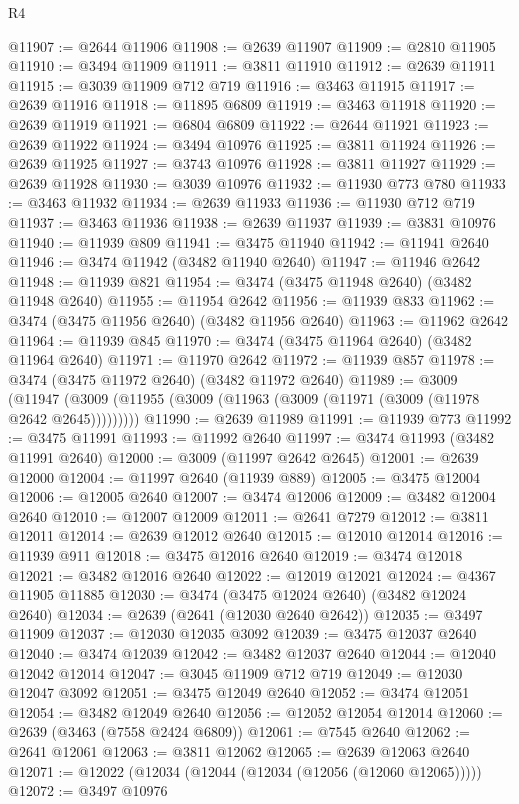\begin{lexlean}{R4}
\begin{coremodule}
@11907 := @2644 @11906
@11908 := @2639 @11907
@11909 := @2810 @11905
@11910 := @3494 @11909
@11911 := @3811 @11910
@11912 := @2639 @11911
@11915 := @3039 @11909 @712 @719
@11916 := @3463 @11915
@11917 := @2639 @11916
@11918 := @11895 @6809
@11919 := @3463 @11918
@11920 := @2639 @11919
@11921 := @6804 @6809
@11922 := @2644 @11921
@11923 := @2639 @11922
@11924 := @3494 @10976
@11925 := @3811 @11924
@11926 := @2639 @11925
@11927 := @3743 @10976
@11928 := @3811 @11927
@11929 := @2639 @11928
@11930 := @3039 @10976
@11932 := @11930 @773 @780
@11933 := @3463 @11932
@11934 := @2639 @11933
@11936 := @11930 @712 @719
@11937 := @3463 @11936
@11938 := @2639 @11937
@11939 := @3831 @10976
@11940 := @11939 @809
@11941 := @3475 @11940
@11942 := @11941 @2640
@11946 := @3474 @11942 (@3482 @11940 @2640)
@11947 := @11946 @2642
@11948 := @11939 @821
@11954 := @3474 (@3475 @11948 @2640) (@3482 @11948 @2640)
@11955 := @11954 @2642
@11956 := @11939 @833
@11962 := @3474 (@3475 @11956 @2640) (@3482 @11956 @2640)
@11963 := @11962 @2642
@11964 := @11939 @845
@11970 := @3474 (@3475 @11964 @2640) (@3482 @11964 @2640)
@11971 := @11970 @2642
@11972 := @11939 @857
@11978 := @3474 (@3475 @11972 @2640) (@3482 @11972 @2640)
@11989 := @3009
    (@11947 (@3009 (@11955 (@3009 (@11963 (@3009 (@11971 (@3009 (@11978 @2642 @2645)))))))))
@11990 := @2639 @11989
@11991 := @11939 @773
@11992 := @3475 @11991
@11993 := @11992 @2640
@11997 := @3474 @11993 (@3482 @11991 @2640)
@12000 := @3009 (@11997 @2642 @2645)
@12001 := @2639 @12000
@12004 := @11997 @2640 (@11939 @889)
@12005 := @3475 @12004
@12006 := @12005 @2640
@12007 := @3474 @12006
@12009 := @3482 @12004 @2640
@12010 := @12007 @12009
@12011 := @2641 @7279
@12012 := @3811 @12011
@12014 := @2639 @12012 @2640
@12015 := @12010 @12014
@12016 := @11939 @911
@12018 := @3475 @12016 @2640
@12019 := @3474 @12018
@12021 := @3482 @12016 @2640
@12022 := @12019 @12021
@12024 := @4367 @11905 @11885
@12030 := @3474 (@3475 @12024 @2640) (@3482 @12024 @2640)
@12034 := @2639 (@2641 (@12030 @2640 @2642))
@12035 := @3497 @11909
@12037 := @12030 @12035 @3092
@12039 := @3475 @12037 @2640
@12040 := @3474 @12039
@12042 := @3482 @12037 @2640
@12044 := @12040 @12042 @12014
@12047 := @3045 @11909 @712 @719
@12049 := @12030 @12047 @3092
@12051 := @3475 @12049 @2640
@12052 := @3474 @12051
@12054 := @3482 @12049 @2640
@12056 := @12052 @12054 @12014
@12060 := @2639 (@3463 (@7558 @2424 @6809))
@12061 := @7545 @2640
@12062 := @2641 @12061
@12063 := @3811 @12062
@12065 := @2639 @12063 @2640
@12071 := @12022 (@12034 (@12044 (@12034 (@12056 (@12060 @12065)))))
@12072 := @3497 @10976

\end{coremodule}
\end{lexlean}
